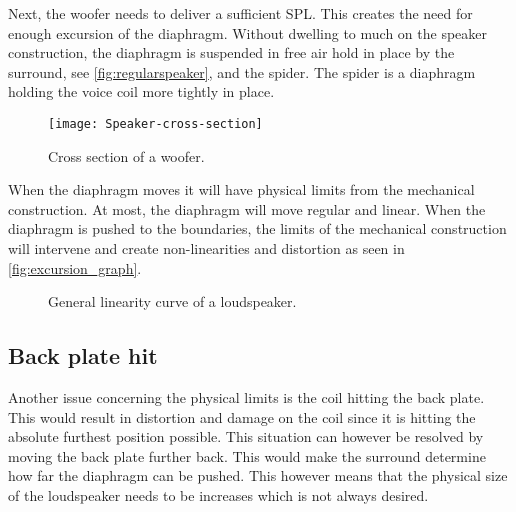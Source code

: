 Next, the woofer needs to deliver a sufficient \gls{SPL}. This creates the need for enough excursion of the diaphragm. Without dwelling to much on the speaker construction, the diaphragm is suspended in free air hold in place by the surround, see \autoref{fig:regularspeaker}, and the spider. The spider is a diaphragm holding the voice coil more tightly in place. 

\begin{figure}[H]
\centering
\texttt{[image: Speaker-cross-section]}
\caption{Cross section of a woofer.}
\label{fig:louderspeakerCrossSection}
\end{figure}

When the diaphragm moves it will have physical limits from the mechanical construction. At most, the diaphragm will move regular and linear. When the diaphragm is pushed to the boundaries, the limits of the mechanical construction will intervene and create non-linearities and distortion as seen in \autoref{fig:excursion_graph}. %

\begin{figure}[H]
\centering
{}

\caption{General linearity curve of a loudspeaker.}
\label{fig:excursion_graph}
\end{figure}





\subsection*{Back plate hit}\label{subsec:impulses}
Another issue concerning the physical limits is the coil hitting the back plate. This would result in distortion and damage on the coil since it is hitting the absolute furthest position possible. This situation can however be resolved by moving the back plate further back. This would make the surround determine how far the diaphragm can be pushed. This however means that the physical size of the loudspeaker needs to be increases which is not always desired.

% 


